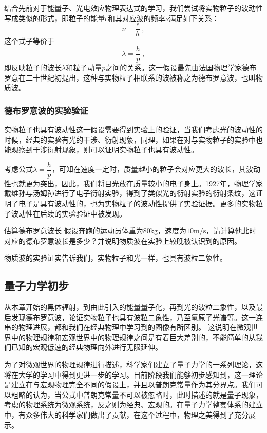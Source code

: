 结合先前对于能量子、光电效应物理表达式的学习，我们尝试将实物粒子的波动性写成类似的形式，即粒子的能量$\epsilon$和其对应波的频率$\nu$满足如下关系：
$$\nu=\dfrac{\epsilon}{h}~,$$这个式子等价于$$\lambda=\dfrac{h}{p}~,$$即反映粒子的波长$\lambda$和粒子动量$p$之间的关系。这一假设最先由法国物理学家德布罗意在二十世纪初提出，这种与实物粒子相联系的波被称之为德布罗意波，也叫物质波。

\subsubsection{德布罗意波的实验验证}
实物粒子也具有波动性这一假设需要得到实验上的验证，当我们考虑光的波动性的时候，经典的实验有光的干涉、衍射现象，同理，如果在对与实物粒子的实验中也能观察到干涉衍射现象，则可以证明实物粒子也具有波动性。

考虑公式$\lambda=\dfrac{h}{p}$，可知在速度一定时，质量越小的粒子会对应更大的波长，其波动性也就更为突出，因此，我们将目光放在质量较小的电子身上。1927年，物理学家戴维孙与汤姆孙进行了电子衍射实验，得到了类似光的衍射实验的衍射条纹，这证明了电子是具有波动性的，也为实物粒子的波动性提供了实验证据。更多的实物粒子波动性在后续的实验验证中被发现。

\begin{exercise}{估算德布罗意波长}
假设奔跑的运动员体重为$80\mathrm{kg}$，速度为$10\mathrm{m/s}$，请计算他此时对应的德布罗意波长是多少？并说明物质波在实验上较晚被认识到的原因。
\end{exercise}

物质波的实验证实告诉我们，实物粒子和光一样，也具有波粒二象性。
\subsection{量子力学初步}

从本章开始的黑体辐射，到由此引入的能量量子化，再到光的波粒二象性，以及最后发现德布罗意波，论证实物粒子也具有波粒二象性，乃至氢原子光谱等。这一连串的物理进展，都和我们在经典物理中学习到的图像有所区别。%
这说明在微观世界中的物理规律和宏观世界中的物理规律之间是有着巨大差别的，不能简单的从我们已知的宏观低速的经典物理向外进行无限延伸。

为了对微观世界的物理规律进行描述，科学家们建立了量子力学的一系列理论，这将在大学的学习中得到更进一步的学习。目前阶段我们能够初步感知到，这一理论是建立在与宏观物理完全不同的假设上，并且以普朗克常量作为其分界点。我们可以粗略的认为，当公式中普朗克常量不可以被忽略时，此时描述的就是量子现象，考虑的物理系统为微观系统，反之则为经典、宏观的。在量子力学整套体系的建立中，有众多伟大的科学家们做出了贡献，在这个过程中，物理之美得到了充分展示。


